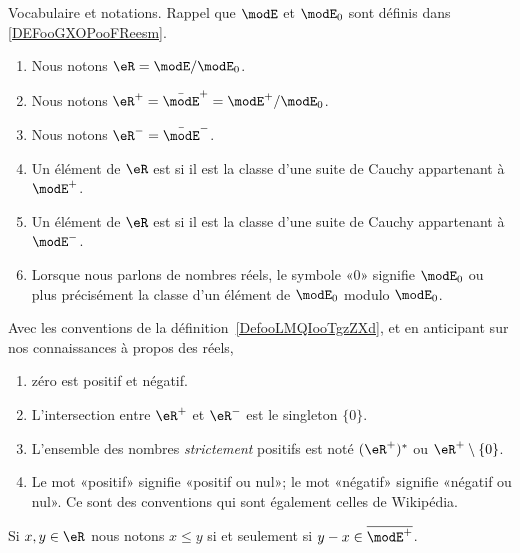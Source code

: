 \begin{definition}        \label{DefooLMQIooTgzZXd}
	Vocabulaire et notations. Rappel que \( \modE\) et \( \modE_0\) sont définis dans \ref{DEFooGXOPooFReesm}.
	\begin{enumerate}
		\item
		      Nous notons \( \eR=\modE/\modE_0\).
		\item
		      Nous notons \( \eR^+=\bar\modE^+=\modE^+/\modE_0\).
		\item
		      Nous notons \( \eR^-=\bar\modE^-\).
		\item
		      Un élément de \( \eR\) est  si il est la classe d'une suite de Cauchy appartenant à \( \modE^+\).
		\item
		      Un élément de \( \eR\) est  si il est la classe d'une suite de Cauchy appartenant à \( \modE^-\).
		\item
		      Lorsque nous parlons de nombres réels, le symbole «\( 0\)» signifie \( \modE_0\) ou plus précisément la classe d'un élément de \( \modE_0\) modulo \( \modE_0\).
	\end{enumerate}
\end{definition}

\begin{normaltext}\label{REMooOCXLooKQrDoq}
	Avec les conventions de la définition~\ref{DefooLMQIooTgzZXd}, et en anticipant sur nos connaissances à propos des réels,
	\begin{enumerate}
		\item
		      zéro est positif et négatif.
		\item
		      L'intersection entre \( \eR^+\) et \( \eR^-\) est le singleton \( \{ 0 \}\).
		\item
		      L'ensemble des nombres \emph{strictement} positifs est noté \( (\eR^+)^*\) ou \( \eR^+\setminus\{ 0 \}\).
		\item
		      Le mot «positif» signifie «positif ou nul»; le mot «négatif» signifie «négatif ou nul». Ce sont des conventions qui sont également celles de Wikipédia\cite{ooSBSSooTlnuKi}.
	\end{enumerate}

\end{normaltext}

\begin{definition}      \label{DEFooBXHJooOEYPRI}
	Si \( x,y\in \eR\) nous notons \( x\leq y\) si et seulement si \( y-x\in\overline{ \modE^+ }\).
\end{definition}

